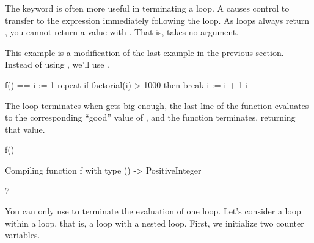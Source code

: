 {%

The  keyword is often more useful
in terminating
a loop.
A  causes control to transfer to the expression
immediately following the loop.
As loops always return \void{},
you cannot return a value with .
That is,  takes no argument.

\begin{xtc}
\begin{xtccomment}
This example is a modification of the last example in
the previous section.
Instead of using , we'll use .
\end{xtccomment}
\begin{spadsrc}
f() ==
  i := 1
  repeat
    if factorial(i) > 1000 then break
    i := i + 1
  i
\end{spadsrc}
\end{xtc}
\begin{xtc}
\begin{xtccomment}
The loop terminates when  gets big enough,
the last line of the function evaluates to the corresponding ``good''
value of , and the function terminates, returning that value.
\end{xtccomment}
\begin{spadsrc}
f() 
\end{spadsrc}
\begin{MessageOutput}
   Compiling function f with type () -> PositiveInteger 
\end{MessageOutput}
\begin{TeXOutput}
\begin{fricasmath}{2}
7%
\end{fricasmath}
\end{TeXOutput}
\end{xtc}
\begin{xtc}
\begin{xtccomment}
You can only use  to terminate the evaluation of one loop.
Let's consider a loop within a loop, that is, a loop with a nested loop.
First, we initialize two counter variables.
\end{xtccomment}
\begin{spadsrc}

\end{spadsrc}
\end{xtc}}
